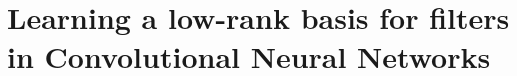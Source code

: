 \documentclass[thesis]{subfiles}
\begin{document}
	
	\chapter{Learning a low-rank basis for filters in Convolutional Neural Networks}
	\label{lowrankfilters}
\end{document}
